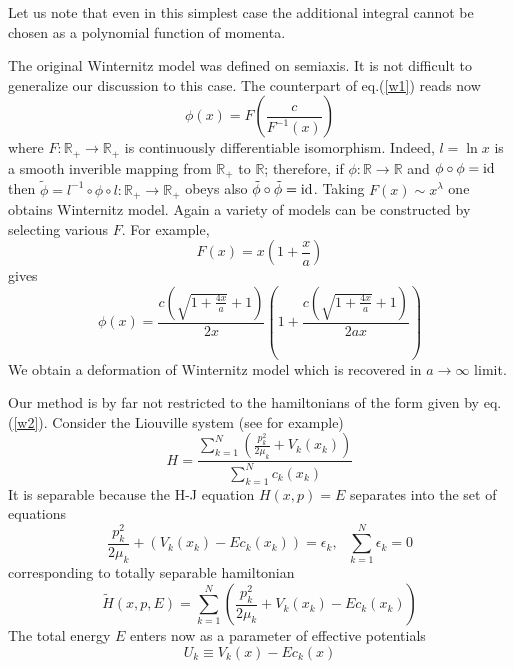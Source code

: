 \documentclass[a4paper,12pt]{article}
\newcommand{\mId}{\mbox{\rm id}}
\newcommand{\mR}{{\mathbb R}}
\begin{document}
Let us note that even in this simplest case the additional integral cannot be chosen as a polynomial
function of momenta.

The original Winternitz model was defined on semiaxis. It is not difficult to generalize our
discussion to this case. The counterpart of eq.(\ref{w1}) reads now
\begin{equation}
\phi(x)=F\left(\frac{c}{F^{-1}(x)}\right)
\label{w16}
\end{equation}
where $F:\mR_{+}\rightarrow\mR_{+}$ is continuously differentiable isomorphism. Indeed, 
$l=\ln x$ is a smooth inverible mapping from $\mR_{+}$ to $\mR$; therefore, if $\phi:\mR\rightarrow\mR$
and $\phi\circ\phi=\mId$ then $\tilde{\phi}=l^{-1}\circ\phi\circ l:\mR_{+}\rightarrow\mR_{+}$ obeys
also $\tilde{\phi}\circ\tilde{\phi}=\mId$. Taking $F(x)\sim x^\lambda$ one obtains Winternitz
model. Again a variety of models can be constructed by selecting various $F$. For example,
\begin{equation}
F(x)=x\left(1+\frac{x}{a}\right)
\label{w17}
\end{equation}
gives
\begin{equation}
\phi(x)=
\frac{\displaystyle c\left(\sqrt{1+\frac{4x}{a}}+1\right)}{\displaystyle 2x}
\left(1+
\frac{\displaystyle c\left(\sqrt{1+\frac{4x}{a}}+1\right)}{\displaystyle 2ax}\right)
\label{w18}
\end{equation}
We obtain a deformation of Winternitz model which is recovered in $a\rightarrow\infty$ limit.

Our method is by far not restricted to the hamiltonians of the form given by eq.(\ref{w2}).
Consider the Liouville system (see \cite{9} for example)
\begin{equation}
H=\frac{\displaystyle \sum_{k=1}^N\left(\frac{p_k^2}{2\mu_k}+V_k(x_k)\right)}{\displaystyle
\sum_{k=1}^Nc_k(x_k)}
\label{w19}
\end{equation}
It is separable because the H-J equation $H(x,p)=E$ separates into the set of equations
\begin{equation}
\frac{p_k^2}{2\mu_k}+(V_k(x_k)-Ec_k(x_k))=\epsilon_k, \ \ \ \sum_{k=1}^N\epsilon_k=0
\label{w20}
\end{equation}
corresponding to totally separable hamiltonian
\begin{equation}
\tilde{H}(x,p,E)=\sum_{k=1}^N\left(\frac{p_k^2}{2\mu_k}+V_k(x_k)-Ec_k(x_k)\right)
\label{w21}
\end{equation}
The total energy $E$ enters now as a parameter of effective potentials
\begin{equation}
U_k\equiv V_k(x)-Ec_k(x)
\label{w22}
\end{equation}
\end{document}
